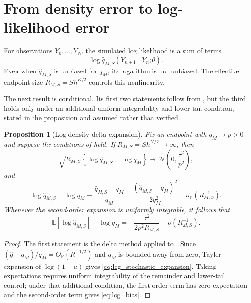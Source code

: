\documentclass[11pt]{article}
\newtheorem{proposition}[proposition]{Proposition}
\theoremstyle{definition}
\newcommand{\E}{\mathbb{E}}
\newcommand{\Pp}{\mathbb{P}}
\newcommand{\op}{o_{\Pp}}
\newcommand{\Op}{O_{\Pp}}
\newcommand{\Normal}{\mathcal{N}}
\begin{document}
\FloatBarrier
\section{From density error to log-likelihood error}\label{sec:loglik}

For observations $Y_0,\ldots,Y_N$, the simulated log likelihood is a sum of terms
\[
\log\widehat q_{M,S}(Y_{n+1}\mid Y_n;\theta).
\]
Even when $\widehat q_{M,S}$ is unbiased for $q_M$, its logarithm is not unbiased. The effective endpoint size $R_{M,S}=S h^{K/2}$ controls this nonlinearity.

The next result is conditional. Its first two statements follow from , but the third holds only under an additional uniform-integrability and lower-tail condition, stated in the proposition and assumed rather than verified.

\begin{proposition}[Log-density delta expansion]\label{prop:log_delta}
Fix an endpoint with $q_M\to p>0$ and suppose the conditions of  hold. If $R_{M,S}=S h^{K/2}\to\infty$, then
\begin{equation}\label{eq:log_clt}
\sqrt{R_{M,S}}
\left\{\log\widehat q_{M,S}-\log q_M\right\}
\Longrightarrow
\Normal\!\left(0,\frac{\tau^2}{p^2}\right),
\end{equation}
and
\begin{equation}\label{eq:log_stochastic_expansion}
\log\widehat q_{M,S}-\log q_M
=
\frac{\widehat q_{M,S}-q_M}{q_M}
-\frac{(\widehat q_{M,S}-q_M)^2}{2q_M^2}
+\op(R_{M,S}^{-1}).
\end{equation}
Whenever the second-order expansion is uniformly integrable, it follows that
\begin{equation}\label{eq:log_bias}
\E[\log\widehat q_{M,S}]-\log q_M
=-\frac{\tau^2}{2p^2R_{M,S}}+o(R_{M,S}^{-1}).
\end{equation}
\end{proposition}

\begin{proof}
The first statement is the delta method applied to . Since $(\widehat q-q_M)/q_M=\Op(R^{-1/2})$ and $q_M$ is bounded away from zero, Taylor expansion of $\log(1+u)$ gives \eqref{eq:log_stochastic_expansion}. Taking expectations requires uniform integrability of the remainder and lower-tail control; under that additional condition, the first-order term has zero expectation and the second-order term gives \eqref{eq:log_bias}.
\end{proof}
\end{document}
